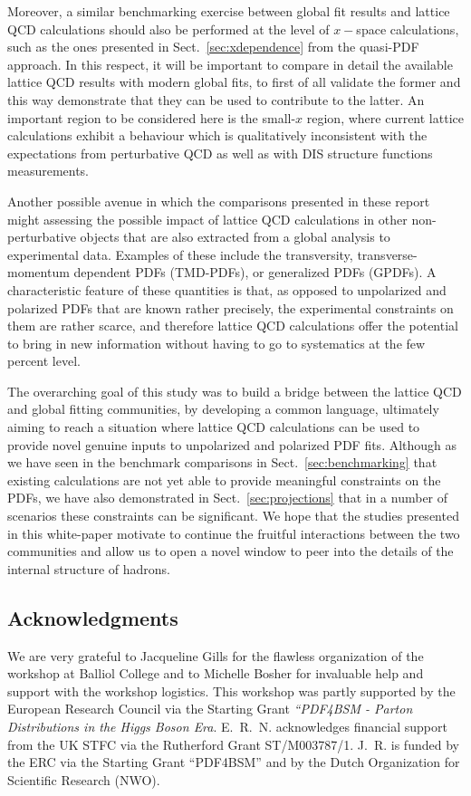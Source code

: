 Moreover, a similar benchmarking exercise between global fit results and lattice
QCD calculations should also be performed at the level of
$x-$space calculations, such as the ones presented in Sect.~\ref{sec:xdependence}
from the quasi-PDF approach.
%
In this respect, it will be important to compare in detail the available lattice
QCD results with modern global fits, to first of all validate the former and
this way demonstrate that they can be used to contribute to the latter.
%
An important region to be considered here is the small-$x$ region, where current lattice
calculations exhibit a behaviour which is qualitatively inconsistent with
the expectations from perturbative QCD as well as with DIS structure functions measurements.

Another possible avenue in which the comparisons presented in these report might assessing
the possible impact of lattice QCD calculations in other non-perturbative objects that
are also extracted from a global analysis to experimental data.
%
Examples of these include the transversity, transverse-momentum dependent PDFs (TMD-PDFs),
or generalized PDFs (GPDFs).
%
A characteristic feature of these quantities is that, as opposed to unpolarized and
polarized PDFs that are known rather precisely, the experimental constraints on them
are rather scarce, and therefore lattice QCD calculations offer the potential
to bring in new information without having to go to systematics at the few percent level.

The overarching goal of this study was to build a bridge between the lattice QCD
and global fitting communities, by developing a common language, ultimately
aiming to reach a situation where
lattice QCD calculations can be used to provide novel genuine inputs
to unpolarized and polarized PDF fits.
%
Although as we have seen in the benchmark comparisons in Sect.~\ref{sec:benchmarking} that
existing calculations are not yet able to provide meaningful constraints on the
PDFs, we have also demonstrated in Sect.~\ref{sec:projections} that in a number
of scenarios these constraints can be significant.
%
We hope that the studies presented in this white-paper motivate to continue the fruitful
interactions between the two communities and allow us to open a novel window
to peer into the details of the internal structure of hadrons.


\subsection*{Acknowledgments}

We are very grateful to Jacqueline Gills for the flawless organization
of the workshop at Balliol College and to Michelle Bosher for
invaluable help and support with the workshop logistics.
%
This workshop was partly supported by the European Research Council via
the Starting Grant {\it ``PDF4BSM - Parton Distributions in the
  Higgs Boson Era}.
%
E.~R.~N. acknowledges financial support from the
UK STFC via the Rutherford Grant ST/M003787/1.
%
J.~R. is funded by the ERC via the Starting Grant ``PDF4BSM'' and by the
Dutch Organization for Scientific Research (NWO).
